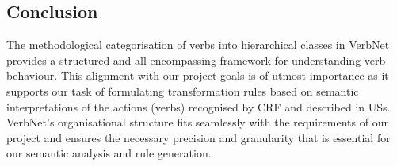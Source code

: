 \subsection*{Conclusion}\label{nlp_bottom_line}
The methodological categorisation of verbs into hierarchical classes in VerbNet provides a structured and all-encompassing framework for understanding verb behaviour. This alignment with our project goals is of utmost importance as it supports our task of formulating transformation rules based on semantic interpretations of the actions (verbs) recognised by CRF and described in USs. VerbNet's organisational structure fits seamlessly with the requirements of our project and ensures the necessary precision and granularity that is essential for our semantic analysis and rule generation.
